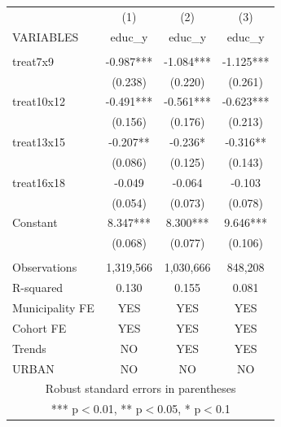 \begin{tabular}{lccc} \hline
 & (1) & (2) & (3) \\
VARIABLES & educ\_y & educ\_y & educ\_y \\ \hline
 &  &  &  \\
treat7x9 & -0.987*** & -1.084*** & -1.125*** \\
 & (0.238) & (0.220) & (0.261) \\
treat10x12 & -0.491*** & -0.561*** & -0.623*** \\
 & (0.156) & (0.176) & (0.213) \\
treat13x15 & -0.207** & -0.236* & -0.316** \\
 & (0.086) & (0.125) & (0.143) \\
treat16x18 & -0.049 & -0.064 & -0.103 \\
 & (0.054) & (0.073) & (0.078) \\
Constant & 8.347*** & 8.300*** & 9.646*** \\
 & (0.068) & (0.077) & (0.106) \\
 &  &  &  \\
Observations & 1,319,566 & 1,030,666 & 848,208 \\
R-squared & 0.130 & 0.155 & 0.081 \\
Municipality FE & YES & YES & YES \\
Cohort FE & YES & YES & YES \\
Trends & NO & YES & YES \\
 URBAN & NO & NO & NO \\ \hline
\multicolumn{4}{c}{ Robust standard errors in parentheses} \\
\multicolumn{4}{c}{ *** p$<$0.01, ** p$<$0.05, * p$<$0.1} \\
\end{tabular}
